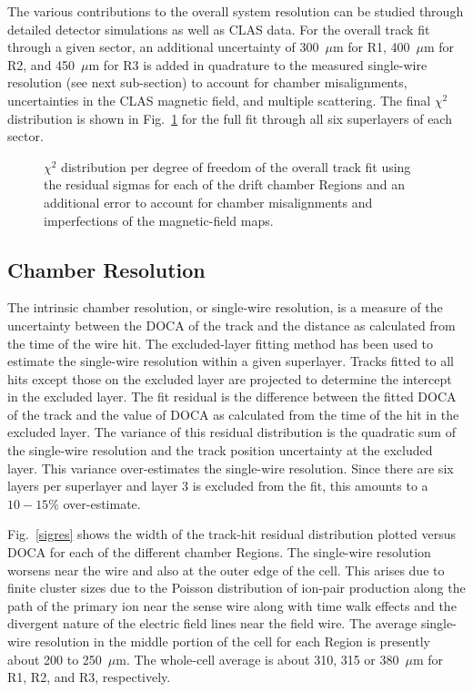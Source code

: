 The various contributions to the overall system resolution can be studied
through detailed detector simulations as well as CLAS data.  For the overall
track fit through a given sector, an additional uncertainty of 300~$\mu$m for 
R1, 400~$\mu$m for R2, and 450~$\mu$m for R3 is added in quadrature to the
measured single-wire resolution (see next sub-section) to account for chamber 
misalignments, uncertainties in the CLAS magnetic field, and multiple scattering.
The final $\chi^2$ distribution is shown in Fig.~\ref{chi2fit} for the 
full fit through all six superlayers of each sector.


\begin{figure}[htpb]
\vspace{5cm} 
\caption{\small{$\chi^2$ distribution per degree of freedom of the overall track 
fit using the residual sigmas for each of the drift chamber Regions and an 
additional error to account for chamber misalignments and imperfections of the
magnetic-field maps.}}
\label{chi2fit}
\end{figure}

\subsection{Chamber Resolution}

\hskip 0.15in
The intrinsic chamber resolution, or single-wire resolution, is a measure
of the uncertainty between the DOCA of the track and the distance as
calculated from the time of the wire hit.  The excluded-layer fitting method 
has been used to estimate the single-wire resolution within a given superlayer.  
Tracks fitted to all hits except those on the excluded layer are projected to 
determine the intercept in the excluded layer.  The fit residual is the difference 
between the fitted DOCA of the track and the value of DOCA as calculated from the 
time of the hit in the excluded layer.  The variance of this residual distribution 
is the quadratic sum of the single-wire resolution and the track position uncertainty 
at the excluded layer.  This variance over-estimates the single-wire resolution.
Since there are six layers per superlayer and layer 3 is excluded from the fit,
this amounts to a $10 - 15\%$ over-estimate.

Fig.~\ref{sigres} shows the width of the track-hit residual distribution plotted versus DOCA for 
each of the different chamber Regions.  The single-wire resolution worsens near the 
wire and also at the outer edge of the cell.  This arises due to finite cluster sizes 
due to the Poisson distribution of ion-pair production along the path of the primary ion 
near the sense wire along with time walk effects and the divergent nature of the electric
field lines near the field wire.  The average single-wire resolution in the middle 
portion of the cell for each Region is presently about 200 to 250~$\mu$m.  The whole-cell 
average is about 310, 315 or 380~$\mu$m for R1, R2, and R3, respectively.

